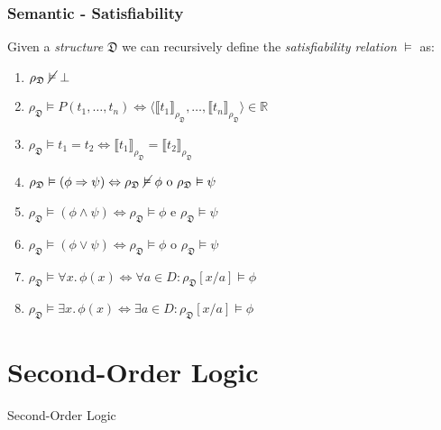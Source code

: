 \documentclass{beamer}
\begin{document}
                \begin{frame}
                    \frametitle{Semantic - Satisfiability}
                    \begin{definition}
                        Given a \textit{structure} $ \mathfrak{D} $ we can recursively define the \textit{satisfiability relation} $ \vDash $ as:
                        \begin{enumerate}
                            \item $ \rho_\mathfrak{D}\; \cancel{\vDash}\; \bot $
                            \item $ \rho_\mathfrak{D} \vDash P(t_1, \dots, t_n) \Leftrightarrow \langle \llbracket t_1 \rrbracket_{\rho_\mathfrak{D}}, \dots, \llbracket t_n \rrbracket_{\rho_\mathfrak{D}} \rangle \in \mathbb{R} $
                            \item $ \rho_\mathfrak{D} \vDash t_1 = t_2 \Leftrightarrow\llbracket t_1 \rrbracket_{\rho_\mathfrak{D}} = \llbracket t_2 \rrbracket_{\rho_\mathfrak{D}} $
                            \item $ \rho_\mathfrak{D} \vDash (\phi \Rightarrow \psi) \Leftrightarrow \rho_\mathfrak{D}\; \cancel{\vDash}\; \phi \text{ o } \rho_\mathfrak{D} \vDash \psi $
                            \item $ \rho_\mathfrak{D} \vDash (\phi \wedge \psi) \Leftrightarrow \rho_\mathfrak{D} \vDash \phi \text{ e } \rho_\mathfrak{D} \vDash \psi $
                            \item $ \rho_\mathfrak{D} \vDash (\phi \vee \psi) \Leftrightarrow \rho_\mathfrak{D} \vDash \phi \text{ o } \rho_\mathfrak{D} \vDash \psi $
                            \item $ \rho_\mathfrak{D} \vDash \forall x.\, \phi(x) \Leftrightarrow \forall a \in D: \rho_\mathfrak{D}[x/a] \vDash \phi $
                            \item $ \rho_\mathfrak{D} \vDash \exists x.\, \phi(x) \Leftrightarrow \exists a \in D: \rho_\mathfrak{D}[x/a] \vDash \phi $
                        \end{enumerate}
                    \end{definition}
                \end{frame}

        \section{Second-Order Logic}
            \begin{frame}
                \begin{center}
                    \begin{Huge}
                        \textcolor{title_blue}{Second-Order Logic}
                    \end{Huge}
                \end{center}
            \end{frame}
\end{document}
